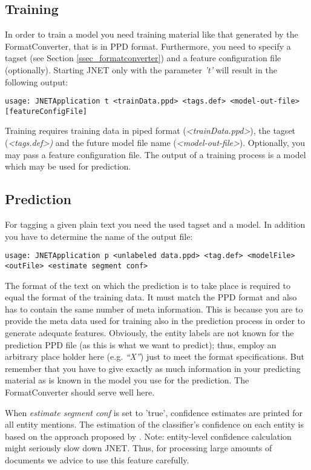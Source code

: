 \documentclass[11pt,a4paper,halfparskip]{scrartcl}
\begin{document}
\subsection{Training}
In order to train a model you need training material like that
generated by the FormatConverter, that is in PPD format.  Furthermore,
you need to specify a tagset (see Section \ref{ssec_formatconverter}) and a
feature
configuration file (optionally). Starting JNET only with the parameter
\textit{'t'} will result in the following output:
\begin{verbatim}
usage: JNETApplication t <trainData.ppd> <tags.def> <model-out-file>
[featureConfigFile]
\end{verbatim}
Training requires training data in piped format
(\textit{<trainData.ppd>}), the tagset (\textit{<tags.def>)} and the
future model file name (\textit{<model-out-file>}).  Optionally, you
may pass a feature configuration file. The output of a training
process is a model which may be used for prediction.


\subsection{Prediction}
\label{sec_prediction}
For tagging a given plain text you need the used tagset and a model.
In addition you have to determine the name of the output file:

\begin{verbatim}
usage: JNETApplication p <unlabeled data.ppd> <tag.def> <modelFile>
<outFile> <estimate segment conf>
\end{verbatim}

The format of the text on which the prediction is to take place is
required to equal the format of the training data. It must match the
PPD format and also has to contain the same number of meta
information. This is because you are to provide the meta data used for
training also in the prediction process in order to generate adequate
features. Obviously, the entity labels are not known for the
prediction PPD file (as this is what we want to predict); thus, employ
an arbitrary place holder here (e.g. \textit{``X''}) just to meet the
format specifications. But remember that you have to give exactly as
much information in your predicting material as is known in the model
you use for the prediction. The FormatConverter should serve well
here.

When \textit{estimate segment conf} is set to 'true', confidence
estimates are printed for all entity mentions. The estimation of the
classifier's confidence on each entity is based on the approach
proposed by \cite{Culotta2004}. Note: entity-level confidence
calculation might seriously slow down JNET. Thus, for processing large
amounts of documents we advice to use this feature carefully.
\end{document}
